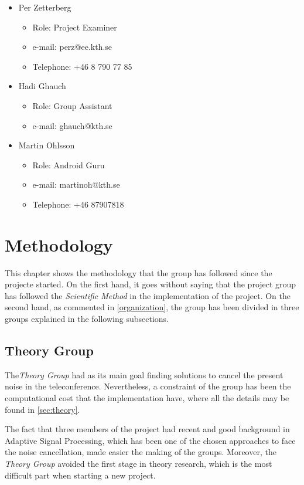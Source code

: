 \documentclass[11pt,a4paper,english]{book}  %
\theoremstyle{definition}  %
\theoremstyle{plain}  %
\theoremstyle{remark}  %
\begin{document}
\begin{itemize}
\item Per Zetterberg
	\begin{itemize}
	\item Role: Project Examiner
	\item e-mail: perz@ee.kth.se
	\item Telephone: +46 8 790 77 85
	\end{itemize}
	
\item Hadi Ghauch
	\begin{itemize}
	\item Role: Group Assistant
	\item e-mail: ghauch@kth.se
	\end{itemize}
	
\item Martin Ohlsson
	\begin{itemize}
	\item Role: Android Guru
	\item e-mail: martinoh@kth.se
	\item Telephone: +46 87907818
	\end{itemize}
\end{itemize}

\chapter{Methodology}
\label{sec:methodology}

This chapter shows the methodology that the group has followed since the projecte started. On the first hand, it goes without saying that the project group has followed the \textit{Scientific Method} in the implementation of the project. On the second hand, as commented in \ref{organization}, the group has been divided in three groups explained in the following subsections.

	\section{Theory Group}

The\textit{Theory Group} had as its main goal finding solutions to cancel the present noise in the teleconference. Nevertheless, a constraint of the group has been the computational cost that the implementation have, where all the details may be found in \ref{sec:theory}.

The fact that three members of the project had recent and good background in Adaptive Signal Processing, which has been one of the chosen approaches to face the noise cancellation, made easier the making of the groups. Moreover, the \textit{Theory Group} avoided the first stage in theory research, which is the most difficult part when starting a new project.
\end{document}
